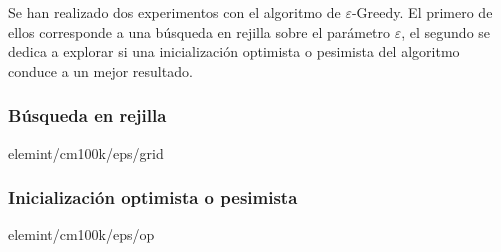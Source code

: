 Se han realizado dos experimentos con el algoritmo de $\varepsilon$-Greedy. %
El primero de ellos corresponde a una búsqueda en rejilla sobre el parámetro $\varepsilon$, el segundo se dedica a explorar si una inicialización optimista o pesimista del algoritmo conduce a un mejor resultado. 
\subsubsection{Búsqueda en rejilla\label{SSS:EPSCM100KGRID}}{elemint/cm100k/eps/grid}

\subsubsection{Inicialización optimista o pesimista\label{SSS:EPSCM100KOP}}{elemint/cm100k/eps/op}
